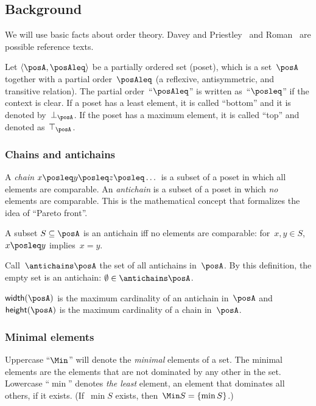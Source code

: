 \subsection{Background\label{sec:Background}}

We will use basic facts about order theory. Davey and Priestley~\cite{davey02}
and Roman~\cite{roman08} are possible reference texts.

Let $\left\langle \posA,\posAleq\right\rangle $ be a partially ordered
set (poset), which is a set~$\posA$ together with a partial order~$\posAleq$
(a reflexive, antisymmetric, and transitive relation). The partial
order~``$\posAleq$'' is written as~``$\posleq$'' if the context
is clear. If a poset has a least element, it is called ``bottom''
and it is denoted by~$\bot_{\posA}$. If the poset has a maximum
element, it is called ``top'' and denoted as~$\top_{\posA}$.

\subsubsection{Chains and antichains}

A \emph{chain} $x\posleq y\posleq z\posleq\dots$ is a subset of a
poset in which all elements are comparable. An \emph{antichain} is
a subset of a poset in which \emph{no} elements are comparable. This
is the mathematical concept that formalizes the idea of ``Pareto
front''.

\begin{definition}[Antichains]
A subset $S\subseteq\posA$ is an antichain iff no elements are comparable:
for~$x,y\in S$, $x\posleq y$ implies~$x=y$. 
\end{definition}
Call~$\antichains\posA$ the set of all antichains in~$\posA$.
By this definition, the empty set is an antichain: $\emptyset\in\antichains\posA$.

\begin{definition}
\label{def:poset-width-height} $\mathsf{width}(\posA)$ is the maximum
cardinality of an antichain in~$\posA$ and $\mathsf{height}(\posA)$
is the maximum cardinality of a chain in~$\posA$.
\end{definition}


\subsubsection{Minimal elements}

Uppercase ``$\Min$'' will denote the \emph{minimal} elements of
a set. The minimal elements are the elements that are not dominated
by any other in the set. Lowercase ``$\min$'' denotes\emph{ the
least} element, an element that dominates all others, if it exists.
(If~$\min S$ exists, then~$\Min S=\{\min S\}$.)   

